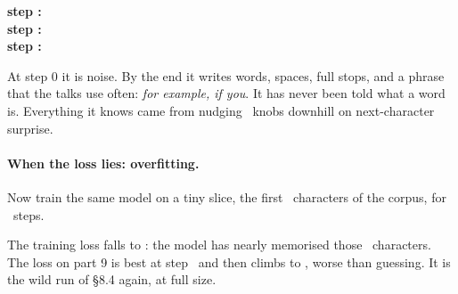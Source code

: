 \begin{plainbox}
\small\raggedright
\noindent\textbf{step \nEightSampleZeroStep:}\ \texttt{\nEightSampleZero}\\[3pt]
\textbf{step \nEightSampleMidStep:}\ \texttt{\nEightSampleMid}\\[3pt]
\textbf{step \nEightSampleEndStep:}\ \texttt{\nEightSampleEnd}
\end{plainbox}
At step 0 it is noise. By the end it writes words, spaces, full stops, and a phrase that the talks use often:
\emph{for example, if you}. It has never been told what a word is. Everything it knows came from
nudging \nEightRunParams\ knobs downhill on next-character surprise.

\paragraph{When the loss lies: overfitting.} Now train the same model on a tiny slice, the first
\nEightOverSmall\ characters of the corpus, for \nEightOverSteps\ steps.

\par\medskip\noindent\begin{minipage}{\linewidth}\centering
{}
\end{minipage}\par\medskip

The training loss falls to \nEightOverTrainEnd: the model has nearly memorised those \nEightOverSmall\
characters. The loss on part 9 is best at step \nEightOverBestStep\ and then climbs to \nEightOverValEnd,
worse than guessing. It is the wild run of \S8.4 again, at full size.

